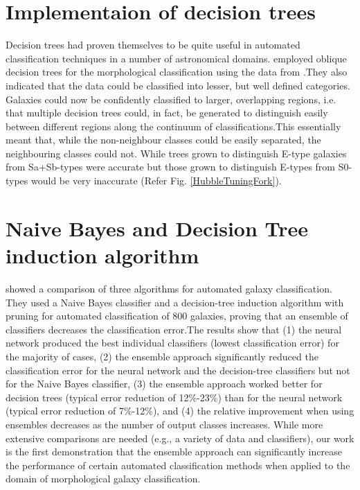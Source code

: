 \documentclass[a4paper,12pt]{report}
\begin{document}
\section{Implementaion of decision trees}
\hspace*{0.5 in}Decision trees had proven themselves to be quite useful in automated classification techniques in a number of astronomical domains. \cite{Owens/mnras/281.1.153} employed oblique decision trees for the morphological classification using the data from \cite{Storrie1992}.They also indicated that the data could be classified into lesser, but well defined categories. Galaxies could now be confidently classified to larger, overlapping regions, i.e. that multiple decision trees could, in fact, be generated to distinguish easily between different regions along the continuum of classifications.This essentially meant that, while the non-neighbour classes could be easily separated, the neighbouring classes could not. While trees grown to distinguish E-type galaxies from Sa+Sb-types were accurate but those grown to distinguish E-types from S0-types would be very inaccurate (Refer Fig. \ref{HubbleTuningFork}).
\section{Naive Bayes and Decision Tree induction algorithm}
\hspace*{0.5 in}\cite{Bazell_2001} showed a comparison of three algorithms for automated galaxy classification. They used a Naive Bayes classifier and a decision-tree induction algorithm with pruning for automated classification of 800 galaxies, proving that an ensemble of classifiers decreases the classification error.The results show that (1) the neural network produced the best individual classifiers (lowest classification error) for the majority of cases, (2) the ensemble approach significantly reduced the classification error for the neural network and the decision-tree classifiers but not for the Naive Bayes classifier, (3) the ensemble approach worked better for decision trees (typical error reduction of 12\%-23\%) than for the neural network (typical error reduction of 7\%-12\%), and (4) the relative improvement when using ensembles decreases as the number of output classes increases. While more extensive comparisons are needed (e.g., a variety of data and classifiers), our work is the first demonstration that the ensemble approach can significantly increase the performance of certain automated classification methods when applied to the domain of morphological galaxy classification.
\end{document}
